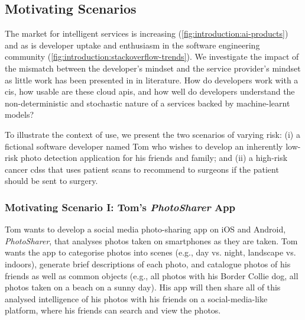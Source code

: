 \subsection{Motivating Scenarios}
\label{ssec:introduction:motivation:scenario}

The market for intelligent services is increasing (\cref{fig:introduction:ai-products}) and as is developer uptake and enthusiasm in the software engineering community (\cref{fig:introduction:stackoverflow-trends}). We investigate the impact of the mismatch between the developer's mindset and the service provider's mindset as little work has been presented in in literature. How do developers work with a \gls{cis}, how usable are these cloud \glspl{api}, and how well do developers understand the non-deterministic and stochastic nature of a services backed by machine-learnt models? 

To illustrate the context of use, we present the two scenarios of varying risk: (i) a fictional software developer named Tom who wishes to develop an inherently low-risk photo detection application for his friends and family; and (ii) a high-risk cancer \gls{cdss} that uses patient scans to recommend to surgeons if the patient should be sent to surgery.
  
\subsubsection{Motivating Scenario I: Tom's \textit{PhotoSharer} App}
\label{ssec:introduction:motivation:scenario:pam}

Tom wants to develop a social media photo-sharing app on iOS and Android, \textit{PhotoSharer}, that analyses photos taken on smartphones as they are taken. Tom wants the app to categorise photos into scenes (e.g., day vs. night, landscape vs. indoors), generate brief descriptions of each photo, and catalogue photos of his friends as well as common objects (e.g., all photos with his Border Collie dog, all photos taken on a beach on a sunny day). His app will then share all of this analysed intelligence of his photos with his friends on a social-media-like platform, where his friends can search and view the photos.

